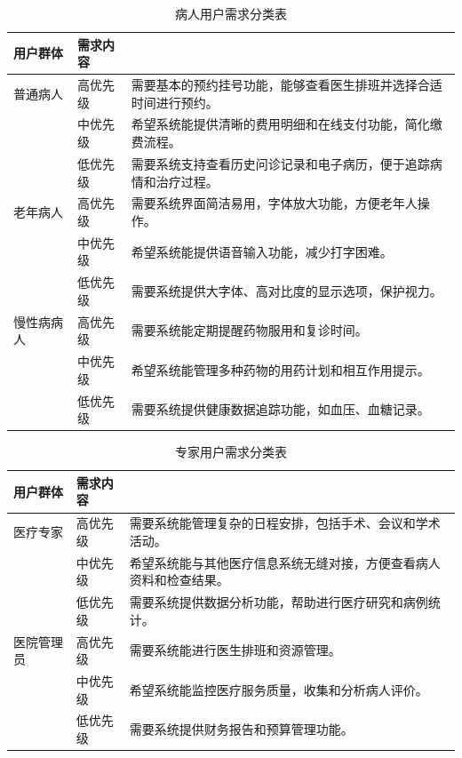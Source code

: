\begin{table}[htbp]
	\centering
	\begin{tabular}{|l|l|p{8cm}|} %
		\hline
		\textbf{用户群体} & \textbf{需求内容} & \\ \hline
		普通病人 & 高优先级 & 需要基本的预约挂号功能，能够查看医生排班并选择合适时间进行预约。 \\ 
		& 中优先级 & 希望系统能提供清晰的费用明细和在线支付功能，简化缴费流程。 \\ 
		& 低优先级 & 需要系统支持查看历史问诊记录和电子病历，便于追踪病情和治疗过程。 \\ \hline
		老年病人 & 高优先级 & 需要系统界面简洁易用，字体放大功能，方便老年人操作。 \\ 
		& 中优先级 & 希望系统能提供语音输入功能，减少打字困难。 \\ 
		& 低优先级 & 需要系统提供大字体、高对比度的显示选项，保护视力。 \\ \hline
		慢性病病人 & 高优先级 & 需要系统能定期提醒药物服用和复诊时间。 \\ 
		& 中优先级 & 希望系统能管理多种药物的用药计划和相互作用提示。 \\ 
		& 低优先级 & 需要系统提供健康数据追踪功能，如血压、血糖记录。 \\ \hline
	\end{tabular}
	\caption{病人用户需求分类表}
\end{table}

\begin{table}[htbp]
	\centering
	\begin{tabular}{|l|l|p{8cm}|} %
		\hline
		\textbf{用户群体} & \textbf{需求内容} & \\ \hline
		医疗专家 & 高优先级 & 需要系统能管理复杂的日程安排，包括手术、会议和学术活动。 \\ 
		& 中优先级 & 希望系统能与其他医疗信息系统无缝对接，方便查看病人资料和检查结果。 \\ 
		& 低优先级 & 需要系统提供数据分析功能，帮助进行医疗研究和病例统计。 \\ \hline
		医院管理员 & 高优先级 & 需要系统能进行医生排班和资源管理。 \\ 
		& 中优先级 & 希望系统能监控医疗服务质量，收集和分析病人评价。 \\ 
		& 低优先级 & 需要系统提供财务报告和预算管理功能。 \\ \hline
	\end{tabular}
	\caption{专家用户需求分类表}
\end{table}

